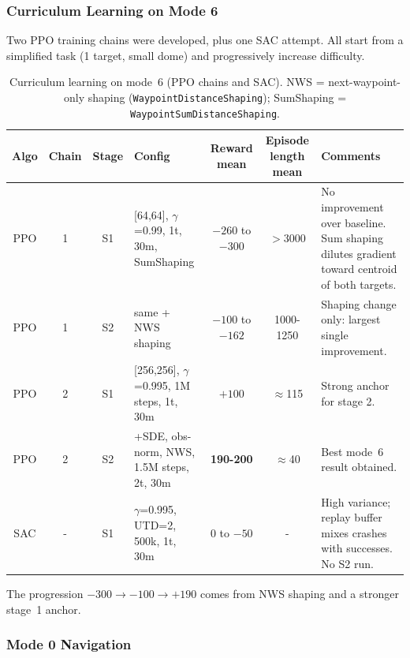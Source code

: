\documentclass[11pt,a4paper]{article}
\begin{document}
\subsubsection{Curriculum Learning on Mode 6}
\label{sec:wp-curriculum-m6}

Two PPO training chains were developed, plus one SAC attempt. All start from a simplified task (1 target, small dome) and progressively increase difficulty. 

\begin{table}[H]
\centering
\footnotesize
\renewcommand{\arraystretch}{1.1}
\begin{tabular}{@{} c c c >{\centering\arraybackslash}p{2.8cm} c c >{\centering\arraybackslash}p{3.2cm} @{}}
\toprule
\textbf{Algo} & \textbf{Chain} & \textbf{Stage} & \textbf{Config} & \textbf{Reward mean} & \textbf{Episode length mean} & \textbf{Comments} \\
\midrule
PPO & 1 & S1 & {[64,64]}, $\gamma$=0.99, 1t, 30m, SumShaping & $-260$ to $-300$ & $>$3000 &
  No improvement over baseline. Sum shaping dilutes gradient toward centroid of both targets. \\
PPO & 1 & S2 & same + NWS shaping & $-100$ to $-162$ & 1000-1250 &
  Shaping change only: largest single improvement. \\
\midrule
PPO & 2 & S1 & {[256,256]}, $\gamma$=0.995, 1M steps, 1t, 30m & $+100$ & $\approx$115 &
  Strong anchor for stage 2. \\
PPO & 2 & S2 & +SDE, obs-norm, NWS, 1.5M steps, 2t, 30m & \textbf{190-200} & $\approx$40 &
  Best mode~6 result obtained. \\
\midrule
SAC & - & S1 & $\gamma$=0.995, UTD=2, 500k, 1t, 30m & 0 to $-50$ & - &
  High variance; replay buffer mixes crashes with successes. No S2 run. \\
\bottomrule
\end{tabular}
\caption{Curriculum learning on mode~6 (PPO chains and SAC). NWS = next-waypoint-only shaping (\texttt{WaypointDistanceShaping}); SumShaping = \texttt{WaypointSumDistanceShaping}.}
\label{tab:wp-curriculum-m6}
\end{table}

The progression $-300 \to -100 \to +190$ comes from NWS shaping and a stronger stage~1 anchor.

\subsubsection{Mode 0 Navigation}
\label{sec:wp-mode0}
\end{document}
